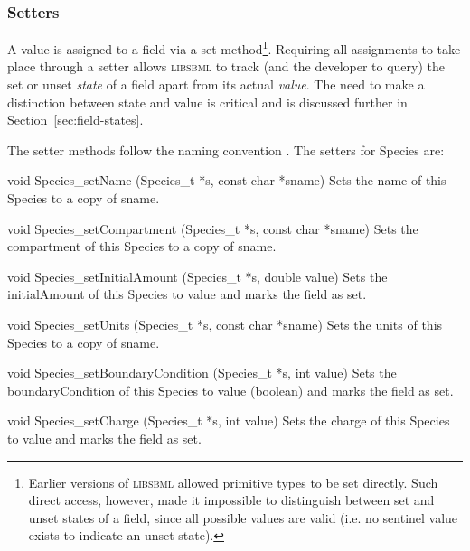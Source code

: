 \documentclass{sbmlmanual}
\begin{document}
\subsubsection{Setters}

A value is assigned to a field via a set method\footnote{Earlier
versions of \textsc{libsbml} allowed primitive types to be set
directly.  Such direct access, however, made it impossible to
distinguish between set and unset states of a field, since all
possible values are valid (i.e. no sentinel value exists to indicate
an unset state).}.  Requiring all assignments to take place through a
setter allows \textsc{libsbml} to track (and the developer to query)
the set or unset \emph{state} of a field apart from its actual
\emph{value}.  The need to make a distinction between state and value
is critical and is discussed further in
Section~\ref{sec:field-states}.

The setter methods follow the naming convention
.  The setters for Species are:


\begin{methoddef}{void Species\_setName (Species\_t *s, const char *sname)}
  Sets the name of this Species to a copy of sname.
\end{methoddef}

\begin{methoddef}{void Species\_setCompartment (Species\_t *s,
const char *sname)}
  Sets the compartment of this Species to a copy of sname.
\end{methoddef}

\begin{methoddef}{void Species\_setInitialAmount (Species\_t *s, double value)}
  Sets the initialAmount of this Species to value and marks the
  field as set.
\end{methoddef}

\begin{methoddef}{void Species\_setUnits (Species\_t *s, const char *sname)}
  Sets the units of this Species to a copy of sname.
\end{methoddef}

\begin{methoddef}{void Species\_setBoundaryCondition (Species\_t *s, int value)}
  Sets the boundaryCondition of this Species to value (boolean) and marks
  the field as set.
\end{methoddef}

\begin{methoddef}{void Species\_setCharge (Species\_t *s, int value)}
  Sets the charge of this Species to value and marks the field as set.
\end{methoddef}
\end{document}
